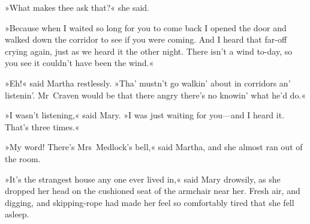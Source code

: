 »What makes thee ask that?« she said.

»Because when I waited so long for you to come back I opened the door and walked down the corridor to see if you were coming. And I heard that far-off crying again, just as we heard it the other night. There isn't a wind to-day, so you see it couldn't have been the wind.«

»Eh!« said Martha restlessly. »Tha' mustn't go walkin' about in corridors an' listenin'. Mr~Craven would be that there angry there's no knowin' what he'd do.«

»I wasn't listening,« said Mary. »I was just waiting for you—and I heard it. That's three times.«

»My word! There's Mrs~Medlock's bell,« said Martha, and she almost ran out of the room.

»It's the strangest house any one ever lived in,« said Mary drowsily, as she dropped her head on the cushioned seat of the armchair near her. Fresh air, and digging, and skipping-rope had made her feel so comfortably tired that she fell asleep.